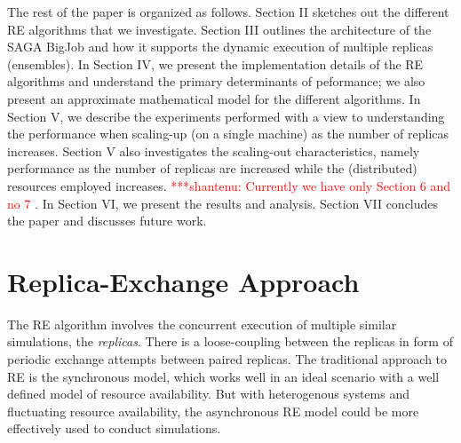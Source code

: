 \documentclass{rspublic}
\newcommand{\jhanote}[1]{ {\textcolor{red} { ***shantenu: #1 }}}
\newcommand{\alnote}[1]{ {\textcolor{blue} { ***andre: #1 }}}
\newcommand{\alnote}[1]{}
\newcommand{\jhanote}[1]{}
\begin{document}
The rest of the paper is organized as follows. Section II sketches out
the different RE algorithms that we investigate. Section III outlines
the architecture of the SAGA BigJob and how it supports the dynamic
execution of multiple replicas (ensembles). In Section IV, we present
the implementation details of the RE algorithms and understand
the primary determinants of peformance; we also present
an approximate mathematical model for the different algorithms.
In Section V, we describe the experiments performed with a view to
understanding the performance when scaling-up (on a single machine) as
the number of replicas increases. Section V also investigates the
scaling-out characteristics, namely performance as the number of
replicas are increased while the (distributed) resources employed
increases. %
\jhanote{Currently we have only Section 6 and no 7}. In Section VI, we
present the results and analysis.  Section VII concludes the paper and
discusses future work.


\section{Replica-Exchange Approach}
\label{sec:repex-approach}
The RE algorithm involves the concurrent execution of multiple similar
simulations, the \emph{replicas}.  There is a loose-coupling between
the replicas in form of periodic exchange attempts between paired
replicas. The traditional approach to RE is the synchronous model,
which works well in an ideal scenario with a well defined model of
resource availability. But with heterogenous systems and fluctuating
resource availability, the asynchronous RE model could be more
effectively used to conduct simulations.


\end{document}
